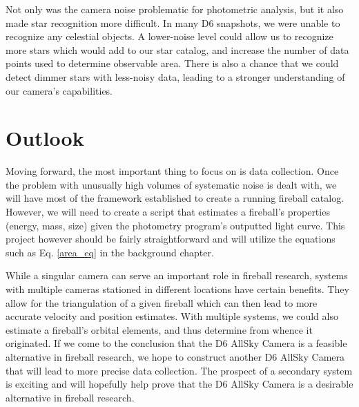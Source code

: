 Not only was the camera noise problematic for photometric analysis, but it also made star recognition more difficult.
In many D6 snapshots, we were unable to recognize any celestial objects.
A lower-noise level could allow us to recognize more stars which would add to our star catalog, and increase the number of data points used to determine observable area.
There is also a chance that we could detect dimmer stars with less-noisy data, leading to a stronger understanding of our camera's capabilities.

\section{Outlook}

Moving forward, the most important thing to focus on is data collection.
Once the problem with unusually high volumes of systematic noise is dealt with, we will have most of the framework established to create a running fireball catalog.
However, we will need to create a script that estimates a fireball's properties (energy, mass, size) given the photometry program's outputted light curve.
This project however should be fairly straightforward and will utilize the equations such as Eq. \ref{area_eq} in the background chapter.

While a singular camera can serve an important role in fireball research, systems with multiple cameras stationed in different locations have certain benefits.
They allow for the triangulation of a given fireball which can then lead to more accurate velocity and position estimates.
With multiple systems, we could also estimate a fireball's orbital elements, and thus determine from whence it originated.
If we come to the conclusion that the D6 AllSky Camera is a feasible alternative in fireball research, we hope to construct another D6 AllSky Camera that will lead to more precise data collection. 
The prospect of a secondary system is exciting and will hopefully help prove that the D6 AllSky Camera is a desirable alternative in fireball research.